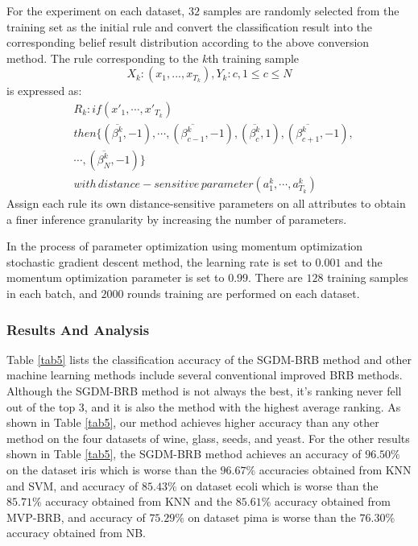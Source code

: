 \documentclass{ieeeaccess}
\begin{document}
For the experiment on each dataset, $32$ samples are randomly selected from the training set as the initial rule
and convert the classification result into the corresponding belief result distribution according to the above conversion method.
The rule corresponding to the $k$th training sample
\begin{equation}
    X_k:(x_1,...,x_{T_k}),Y_k:c,1\leq c\leq N
\end{equation}
is expressed as:
\begin{equation}
    \begin{split}
        &R_k:if(x'_1,\cdots,x'_{T_k})\\
        &then\{(\overline{\beta_1^k},-1),\cdots,(\overline{\beta_{c-1}^k},-1),(\overline{\beta_c^k},1),(\overline{\beta_{c+1}^k},-1),\\
        &\cdots,(\overline{\beta_N^k},-1)\}\\
        &with\, distance-sensitive\, parameter(a^k_1,\cdots,a^k_{T_k})
    \end{split}
\end{equation}
Assign each rule its own distance-sensitive parameters on all attributes to obtain a finer inference granularity by increasing the number of parameters.

In the process of parameter optimization using momentum optimization stochastic gradient descent method,
the learning rate is set to $0.001$ and the momentum optimization parameter is set to $0.99$.
There are $128$ training samples in each batch, and $2000$ rounds training are performed on each dataset.

\subsubsection{Results And Analysis}
Table \ref{tab5} lists the classification accuracy of the SGDM-BRB method and other machine learning methods include several conventional improved BRB methods.
Although the SGDM-BRB method is not always the best, it's ranking never fell out of the top $3$, and it is also the method with the highest average ranking.
As shown in Table \ref{tab5}, our method achieves higher accuracy than any other method on the four datasets of
wine, glass, seeds, and yeast.
For the other results shown in Table \ref{tab5},
the SGDM-BRB method achieves an accuracy of $96.50\%$ on the dataset iris
which is worse than the $96.67\%$ accuracies obtained from KNN and SVM,
and accuracy of $85.43\%$ on dataset ecoli
which is worse than the $85.71\%$ accuracy obtained from KNN and the $85.61\%$ accuracy obtained from MVP-BRB,
and accuracy of $75.29\%$ on dataset pima is worse than the $76.30\%$ accuracy obtained from NB.
\end{document}
